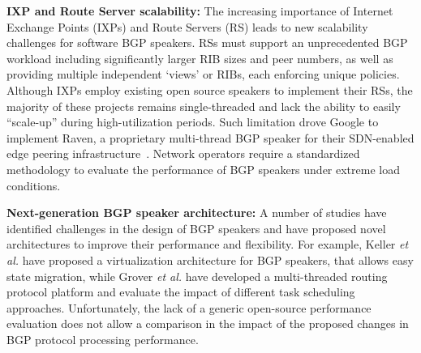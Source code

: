 \textbf{IXP and Route Server scalability:} The increasing importance of Internet Exchange Points (IXPs) and Route Servers
(RS) leads to new scalability challenges for software BGP speakers.
RSs must support an unprecedented BGP workload including significantly larger
RIB sizes and peer numbers, as well as providing multiple independent `views'
or RIBs, each enforcing unique policies. Although IXPs employ existing open
source speakers to implement their RSs, the majority of these projects remains
single-threaded and lack the ability to easily ``scale-up'' during
high-utilization periods. Such limitation drove Google to implement Raven,
a proprietary multi-thread BGP speaker for their SDN-enabled edge peering
infrastructure~\cite{Yap2017}. Network operators require a standardized
methodology to evaluate the performance of BGP speakers under extreme load
conditions.



\textbf{Next-generation BGP speaker architecture:} A number of studies have
identified challenges in the design of BGP speakers and have proposed novel
architectures to improve their performance and flexibility. For example,
Keller \textit{et al.}\cite{Keller2010b} have proposed a virtualization architecture for
BGP speakers, that allows easy state migration,
while Grover \textit{et al.}\cite{grover2011} have developed a multi-threaded routing protocol
platform and evaluate the impact of different task scheduling approaches.
Unfortunately, the lack of a generic open-source performance evaluation does
not allow a comparison in the impact of the proposed changes in BGP protocol
processing performance.
